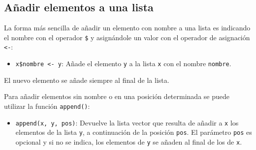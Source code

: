 \documentclass[
  a4paper,
]{scrreport}
\providecommand{\tightlist}{%
  \setlength{\itemsep}{0pt}\setlength{\parskip}{0pt}}\usepackage{longtable,booktabs,array}
\theoremstyle{definition}
\theoremstyle{definition}
\theoremstyle{remark}
\begin{document}
\hypertarget{auxf1adir-elementos-a-una-lista}{%
\subsection{Añadir elementos a una
lista}\label{auxf1adir-elementos-a-una-lista}}

La forma más sencilla de añadir un elemento con nombre a una lista es
indicando el nombre con el operador \texttt{\$} y asignándole un valor
con el operador de asignación \texttt{\textless{}-}:

\begin{itemize}
\tightlist
\item
  \texttt{x\$nombre\ \textless{}-\ y}: Añade el elemento \texttt{y} a la
  lista \texttt{x} con el nombre \texttt{nombre}.
\end{itemize}

El nuevo elemento se añade siempre al final de la lista.

Para añadir elementos sin nombre o en una posición determinada se puede
utilizar la función \texttt{append()}:

\begin{itemize}
\tightlist
\item
  \texttt{append(x,\ y,\ pos)}: Devuelve la lista vector que resulta de
  añadir a \texttt{x} los elementos de la lista \texttt{y}, a
  continuación de la posición \texttt{pos}. El parámetro \texttt{pos} es
  opcional y si no se indica, los elementos de \texttt{y} se añaden al
  final de los de \texttt{x}.
\end{itemize}
\end{document}
